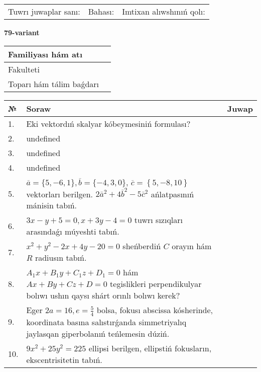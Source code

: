 \documentclass{article}
\begin{document}
\vspace{0.7cm}

\begin{tabular}{lll}
Tuwrı juwaplar sanı: \underline{\hspace{1cm}} & 
Bahası: \underline{\hspace{1cm}} & 
Imtixan alıwshınıń qolı: \underline{\hspace{2cm}} \\
\end{tabular}

\egroup

\newpage


\textbf{79-variant}\\

\bgroup
\def\arraystretch{1.6} %

\begin{tabular}{|m{5.7cm}|m{9.5cm}|}
\hline
Familiyası hám atı & \\
\hline
Fakulteti  & \\
\hline
Toparı hám tálim baǵdarı  & \\
\hline
\end{tabular}

\vspace{0.7cm}

\begin{tabular}{|m{0.7cm}|m{10cm}|m{4cm}|}
\hline
№ & Soraw & Juwap \\
\hline
1. & Eki vektordıń skalyar kóbeymesiniń formulası? &  \\
\hline
2. & undefined &  \\
\hline
3. & undefined &  \\
\hline
4. & undefined &  \\
\hline
5. & \(\overline{a} = \{5,- 6, 1 \}, \overline{b} = \{ - 4, 3, 0 \} \), \(\overline{c} = \left\{ 5,- 8, 10 \right\}\) vektorları berilgen. \(2{\bar{a}}^{2} + 4{\bar{b}}^{2} - 5{\bar{c}}^{2}\) ańlatpasınıń mánisin tabıń. &  \\
\hline
6. & \(3 x - y + 5 = 0, x + 3 y - 4 = 0\) tuwrı sızıqları arasındaǵı múyeshti tabıń. &  \\
\hline
7. & \(x^{2} + y^{2} - 2 x + 4 y - 20 = 0\) sheńberdiń \(C\) orayın hám \(R\) radiusın tabıń. &  \\
\hline
8. & \(A_{1}x + B_{1}y + C_{1}z + D_{1} = 0\) hám \(Ax + By + Cz + D = 0\) tegislikleri perpendikulyar bolıwı ushın qaysı shárt orınlı bolıwı kerek? &  \\
\hline
9. & Eger \(2 a = 16, e = \frac{5}{4}\) bolsa, fokusı abscissa kósherinde, koordinata basına salıstırǵanda simmetriyalıq jaylasqan giperbolanıń teńlemesin dúziń. &  \\
\hline
10. & \(9 x^{2} + 25 y^{2} = 225\) ellipsi berilgen, ellipstiń fokusların, ekscentrisitetin tabıń. & \\
\hline
\end{tabular}
\end{document}
